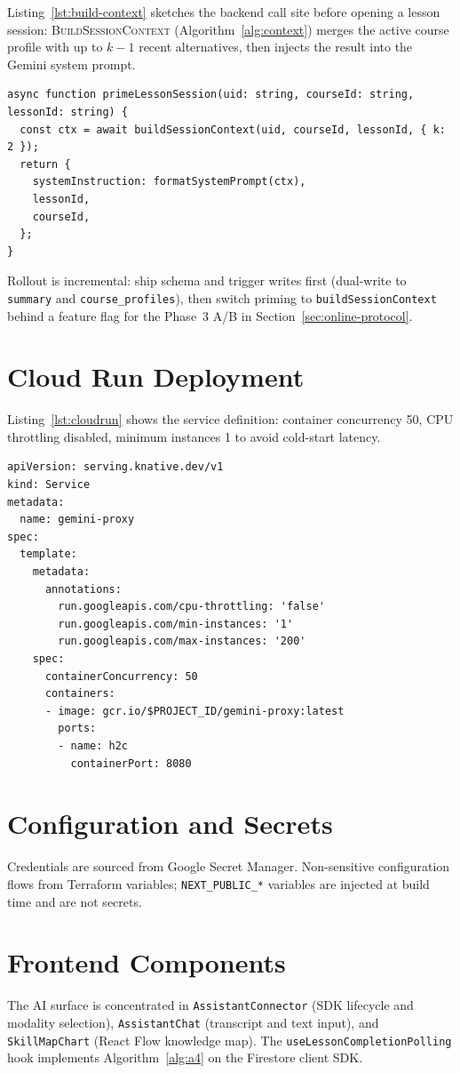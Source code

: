 Listing~\ref{lst:build-context} sketches the backend call site before opening a lesson session: \textsc{BuildSessionContext} (Algorithm~\ref{alg:context}) merges the active course profile with up to $k-1$ recent alternatives, then injects the result into the Gemini system prompt.

\begin{lstlisting}[caption={Planned session priming hook (\texttt{sprout-backend}).},label=lst:build-context]
async function primeLessonSession(uid: string, courseId: string, lessonId: string) {
  const ctx = await buildSessionContext(uid, courseId, lessonId, { k: 2 });
  return {
    systemInstruction: formatSystemPrompt(ctx),
    lessonId,
    courseId,
  };
}
\end{lstlisting}

Rollout is incremental: ship schema and trigger writes first (dual-write to \texttt{summary} and \texttt{course\_profiles}), then switch priming to \texttt{buildSessionContext} behind a feature flag for the Phase~3 A/B in Section~\ref{sec:online-protocol}.

\section{Cloud Run Deployment}
\label{sec:cloudrun}

Listing~\ref{lst:cloudrun} shows the service definition: container concurrency 50, CPU throttling disabled, minimum instances 1 to avoid cold-start latency.

\begin{lstlisting}[caption={Cloud Run service definition for \texttt{gemini-proxy}.},label=lst:cloudrun]
apiVersion: serving.knative.dev/v1
kind: Service
metadata:
  name: gemini-proxy
spec:
  template:
    metadata:
      annotations:
        run.googleapis.com/cpu-throttling: 'false'
        run.googleapis.com/min-instances: '1'
        run.googleapis.com/max-instances: '200'
    spec:
      containerConcurrency: 50
      containers:
      - image: gcr.io/$PROJECT_ID/gemini-proxy:latest
        ports:
        - name: h2c
          containerPort: 8080
\end{lstlisting}

\section{Configuration and Secrets}
\label{sec:secrets}

Credentials are sourced from Google Secret Manager. Non-sensitive configuration flows from Terraform variables; \texttt{NEXT\_PUBLIC\_*} variables are injected at build time and are not secrets.

\section{Frontend Components}
\label{sec:frontend}

The AI surface is concentrated in \texttt{AssistantConnector} (SDK lifecycle and modality selection), \texttt{AssistantChat} (transcript and text input), and \texttt{SkillMapChart} (React Flow knowledge map). The \texttt{useLessonCompletionPolling} hook implements Algorithm~\ref{alg:a4} on the Firestore client SDK.
